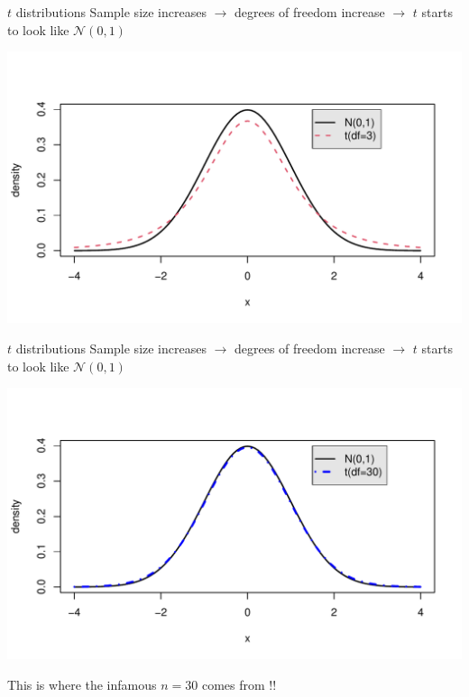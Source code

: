 \documentclass[10pt,handout]{beamer}\usepackage[]{graphicx}\usepackage[]{color}
\makeatletter
\def\maxwidth{ %
  \ifdim\Gin@nat@width>\linewidth
    \linewidth
  \else
    \Gin@nat@width
  \fi
}
\newenvironment{knitrout}{}{} %
\makeatother
\begin{document}
\begin{frame}[fragile]{$t$ distributions}
	Sample size increases $\rightarrow$ degrees of freedom increase $\rightarrow$ $t$ starts to look like $\mathcal{N}(0,1)$
\begin{knitrout}\tiny
{}\color{fgcolor}

{\centering \includegraphics[width=\maxwidth]{figure/unnamed-chunk-8-1} 

}



\end{knitrout}
\end{frame}

\begin{frame}[fragile]{$t$ distributions}
	Sample size increases $\rightarrow$ degrees of freedom increase $\rightarrow$ $t$ starts to look like $\mathcal{N}(0,1)$
\begin{knitrout}\tiny
{}\color{fgcolor}

{\centering \includegraphics[width=\maxwidth]{figure/unnamed-chunk-9-1} 

}



\end{knitrout}
	
	\Large This is where the infamous $n=30$ comes from !!
\end{frame}
\end{document}
